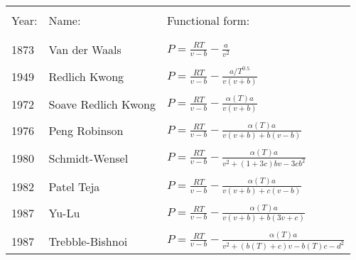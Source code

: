 \begin{tabular}{| l l l |}
\hline
		&\vspace{-4mm}		&    \\
Year: 	& 	Name:	 			&         Functional form:   \\
		&\vspace{-4mm}		&    \\
\hline
		&\vspace{-4mm}		&    \\
1873	&	Van der Waals		&	$P=\frac{RT}{v-b}-\frac{a}{v^2} $ 	 \\
		&\vspace{-4mm}		&    \\

1949	&	Redlich Kwong	 	&         $P=\frac{RT}{v-b}-\frac{a/T^{0.5}}{v\left(v+b\right)}$    	 \\
		&\vspace{-4mm}		&    \\

1972	&	Soave Redlich Kwong		&	$P=\frac{RT}{v-b}-\frac{\alpha(T)a}{v\left(v+b\right)} $       	  \\
		&\vspace{-4mm}		&    \\

1976	&	Peng Robinson		&	$P=\frac{RT}{v-b}-\frac{\alpha(T)a}{v\left(v+b\right)+b(v-b)} $      	  \\

		&\vspace{-4mm}		&    \\

1980	&	Schmidt-Wensel		&	$P=\frac{RT}{v-b}-\frac{\alpha(T)a}{v^2+(1+3c)bv-3cb^2} $      \\

		&\vspace{-4mm}		&    \\

1982	&	Patel Teja			&	$P=\frac{RT}{v-b}-\frac{\alpha(T)a}{v\left(v+b\right)+c(v-b)} $        \\
		&\vspace{-4mm}		&    \\

1987	&	Yu-Lu				&	$P=\frac{RT}{v-b}-\frac{\alpha(T)a}{v\left(v+b\right)+b(3v+c)} $     \\
		&\vspace{-4mm}		&    \\

1987	&	Trebble-Bishnoi		&	$P=\frac{RT}{v-b}-\frac{\alpha(T)a}{v^2+(b(T)+c)v-b(T)c-d^2} $    \\
\hline
\end{tabular}
